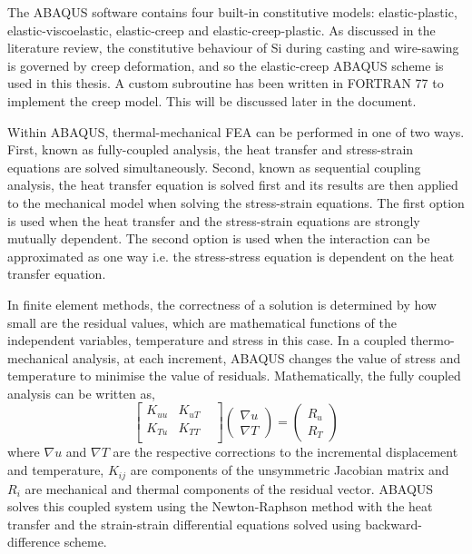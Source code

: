 The ABAQUS software contains four built-in constitutive models: elastic-plastic, elastic-viscoelastic, elastic-creep and elastic-creep-plastic. As discussed in the literature review, the constitutive behaviour of Si during casting and wire-sawing is governed by creep deformation, and so the elastic-creep ABAQUS scheme is used in this thesis. A custom  subroutine has been written in FORTRAN 77 to implement the creep model. This will be discussed later in the document. 

Within ABAQUS, thermal-mechanical FEA can be performed in one of two ways. First, known as fully-coupled analysis, the heat transfer and stress-strain equations are solved simultaneously. Second, known as sequential coupling analysis, the heat transfer equation is solved first and its results are then applied to the mechanical model when solving the stress-strain equations. The first option is used when the heat transfer and the stress-strain equations are strongly mutually dependent. The second option is used when the interaction can be approximated as one way i.e. the stress-stress equation is dependent on the heat transfer equation.

In finite element methods, the correctness of a solution is determined by how small are the residual values, which are mathematical functions of the independent variables, temperature and stress in this case. In a coupled thermo-mechanical analysis, at each increment, ABAQUS changes the value of stress and temperature to minimise the value of residuals. Mathematically, the fully coupled analysis can be written as, 
\begin{equation}
\begin{bmatrix}
K_{uu} &  K_{uT} & \\ 
K_{Tu} &  K_{TT} & \\ 
\end{bmatrix} 
\begin{pmatrix}
\nabla u\\ 
\nabla T
\end{pmatrix}
= 
\begin{pmatrix}
R_{u}\\ 
R_{T}
\end{pmatrix}
\label {coupled_anal}
\end{equation}
where $\nabla u$ and $\nabla T$ are the respective corrections to the incremental displacement and temperature, $K_{ij}$ are components of the unsymmetric Jacobian matrix and $R_{i}$ are mechanical and thermal components of the residual vector. ABAQUS solves this coupled system using the Newton-Raphson method with the heat transfer and the strain-strain differential equations solved using backward-difference scheme.

